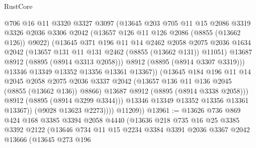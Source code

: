 \begin{lexlean}{RustCore}
\begin{coremodule}
                        @706
                        @16
                        @11
                        @3320
                        @3327
                        @3097
                        (@13645
                          @203
                          @705
                          @11
                          @15
                          @2086
                          @3319
                          @3326
                          @2036
                          @3306
                          @2042
                          (@13657 @126 @11 @126 @2086 (@8855 (@13662 @126)) @9022)
                          (@13645
                            @371
                            @196
                            @11
                            @14
                            @2462
                            @2058
                            @2075
                            @2036
                            @1634
                            @2042
                            (@13657 @131 @11 @131 @2462 (@8855 (@13662 @131)) @11051)
                            @13687
                            @8912
                            (@8895 (@8914 @3313 @2058)))
                          @8912
                          (@8895 (@8914 @3307 @3319)))
                        @13346
                        @13349
                        @13352
                        @13356
                        @13361
                        @13367))
                    (@13645
                      @184
                      @196
                      @11
                      @14
                      @2045
                      @2058
                      @2075
                      @2036
                      @3337
                      @2042
                      (@13657 @136 @11 @136 @2045 (@8855 (@13662 @136)) @8866)
                      @13687
                      @8912
                      (@8895 (@8914 @3338 @2058)))
                    @8912
                    (@8895 (@8914 @3299 @3344)))
                  @13346
                  @13349
                  @13352
                  @13356
                  @13361
                  @13367))
              (@9028 @13623 @2273))))
        @11209))
@13961 := @13626
    @736
    @869
    @424
    @168
    @3385
    @3394
    @2058
    @4440
    (@13636
      @218
      @735
      @16
      @25
      @3385
      @3392
      @2122
      (@13646
        @734
        @11
        @15
        @2234
        @3384
        @3391
        @2036
        @3367
        @2042
        @13666
        (@13645
          @273
          @196

\end{coremodule}
\end{lexlean}
